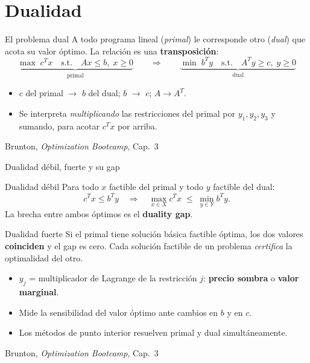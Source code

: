 \documentclass[10pt,aspectratio=169]{beamer}
\newcommand{\fuente}{\vfill{\scriptsize\color{gray}Brunton, \emph{Optimization Bootcamp}, Cap.~3}}
\begin{document}
\section{Dualidad}

\begin{frame}{El problema dual}
  \small
  A todo programa lineal (\emph{primal}) le corresponde otro (\emph{dual}) que acota
  su valor óptimo. La relación es una \textbf{transposición}:
  \[
    \underbrace{\max\; c^T x \quad \text{s.t.}\quad Ax \le b,\; x \ge 0}_{\text{primal}}
    \qquad\Longrightarrow\qquad
    \underbrace{\min\; b^T y \quad \text{s.t.}\quad A^T y \ge c,\; y \ge 0}_{\text{dual}}
  \]
  \begin{itemize}
    \item $c$ del primal $\to$ $b$ del dual; $b$ $\to$ $c$; $A \to A^T$.
    \item Se interpreta \emph{multiplicando} las restricciones del primal por
      $y_1, y_2, y_3$ y sumando, para acotar $c^T x$ por arriba.
  \end{itemize}
  \fuente
\end{frame}

\begin{frame}{Dualidad débil, fuerte y su gap}
  \small
  \begin{block}{Dualidad débil}
    Para todo $x$ factible del primal y todo $y$ factible del dual:
    \[
      c^T x \le b^T y
      \quad\Longrightarrow\quad
      \max_{x\in X} c^T x \;\le\; \min_{y\in Y} b^T y .
    \]
    La brecha entre ambos óptimos es el \textbf{duality gap}.
  \end{block}
  \begin{block}{Dualidad fuerte}
    Si el primal tiene solución básica factible óptima, los dos valores
    \textbf{coinciden} y el gap es cero. Cada solución factible de un problema
    \emph{certifica} la optimalidad del otro.
  \end{block}
  \begin{itemize}
    \item $y_j$ = multiplicador de Lagrange de la restricción $j$:
      \textbf{precio sombra} o \textbf{valor marginal}.
    \item Mide la sensibilidad del valor óptimo ante cambios en $b$ y en $c$.
    \item Los métodos de punto interior resuelven primal y dual simultáneamente.
  \end{itemize}
  \fuente
\end{frame}
\end{document}
